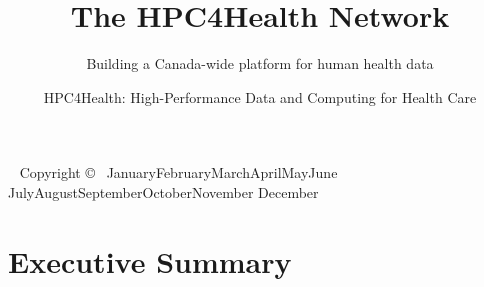 \documentclass[twoside,symmetric,sfsidenotes,notoc]{tufte-book}
\title{The HPC4Health Network}
\subtitle{Building a Canada-wide platform for human health data}
\author{HPC4Health: High-Performance Data and Computing for Health Care}
\newcommand{\monthyear}{%
  \ifcase\month\or January\or February\or March\or April\or May\or June\or
  July\or August\or September\or October\or November\or
  December\fi\space\number\year
}
\begin{document}
\frontmatter

\maketitle


\newpage
\begin{fullwidth}
~\vfill
\thispagestyle{empty}
\setlength{\parindent}{0pt}
\setlength{\parskip}{\baselineskip}
Copyright \copyright\ \monthyear
\par{}
\par{}
\end{fullwidth}

\cleardoublepage
\chapter*{Executive Summary}
\end{document}
